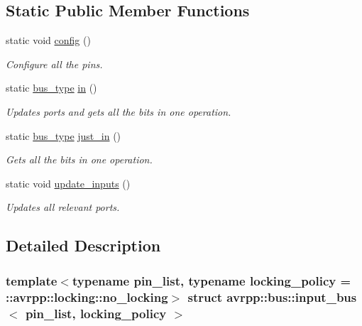 \subsection*{Static Public Member Functions}
\begin{DoxyCompactItemize}
\item 
static void \hyperlink{structavrpp_1_1bus_1_1input__bus_a99ef9e47967628c5e88e9f5368ea12ca}{config} ()
\begin{DoxyCompactList}\small\item\em Configure all the pins. \item\end{DoxyCompactList}\item 
static \hyperlink{structavrpp_1_1bus_1_1input__bus_aa1146b9861eb713a67224e329e4244a9}{bus\_\-type} \hyperlink{structavrpp_1_1bus_1_1input__bus_a669e3de20ee1f6fd42bc1a8026dac8b8}{in} ()
\begin{DoxyCompactList}\small\item\em Updates ports and gets all the bits in one operation. \item\end{DoxyCompactList}\item 
static \hyperlink{structavrpp_1_1bus_1_1input__bus_aa1146b9861eb713a67224e329e4244a9}{bus\_\-type} \hyperlink{structavrpp_1_1bus_1_1input__bus_a5fe28d20b59afe973c19b6b6577694ca}{just\_\-in} ()
\begin{DoxyCompactList}\small\item\em Gets all the bits in one operation. \item\end{DoxyCompactList}\item 
static void \hyperlink{structavrpp_1_1bus_1_1input__bus_aba570b100c74756f1dffa59e0522d076}{update\_\-inputs} ()
\begin{DoxyCompactList}\small\item\em Updates all relevant ports. \item\end{DoxyCompactList}\end{DoxyCompactItemize}


\subsection{Detailed Description}
\subsubsection*{template$<$typename pin\_\-list, typename locking\_\-policy = ::avrpp::locking::no\_\-locking$>$ struct avrpp::bus::input\_\-bus$<$ pin\_\-list, locking\_\-policy $>$}


